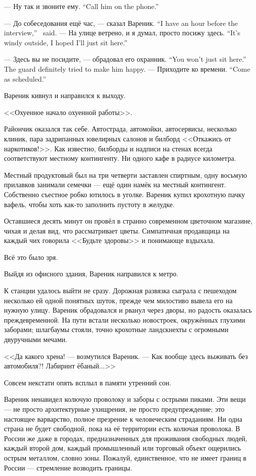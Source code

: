 {--- Ну так и звоните ему.}
{``Call him on the phone.''}

{--- До собеседования ещё час, --- сказал Вареник.}
{``I have an hour before the interview,'' \Varenik\ said.}
{--- На улице ветрено, и я думал, просто посижу здесь.}
{``It's windy outside, I hoped I'll just sit here.''}

{--- Здесь вы не посидите, --- обрадовал его охранник.}
{``You won't just sit here.'' The guard definitely tried to make him happy.}
{--- Приходите ко времени.}
{``Come as scheduled.''}

Вареник кивнул и направился к выходу.

<<Охуенное начало охуенной работы>>.

Райончик оказался так себе.
Автострада, автомойки, автосервисы, несколько клиник, пара задрипанных ювелирных салонов и билборд <<Откажись от наркотиков!>>.
Как известно, билборды и надписи на стенах всегда соответствуют местному контингенту.
Ни одного кафе в радиусе километра.

Местный продуктовый был на три четверти заставлен спиртным, одну восьмую прилавков занимали семечки --- ещё один намёк на местный контингент.
Собственно съестное робко ютилось в уголке.
Вареник купил крохотную пачку вафель, чтобы хоть как-то заполнить пустоту в желудке.

Оставшиеся десять минут он провёл в странно современном цветочном магазине, чихая и делая вид, что рассматривает цветы.
Симпатичная продавщица на каждый чих говорила <<Будьте здоровы>> и понимающе вздыхала.

Всё это было зря.

\asterism

Выйдя из офисного здания, Вареник направился к метро.

К станции удалось выйти не сразу.
Дорожная развязка сыграла с пешеходом несколько ей одной понятных шуток, прежде чем милостиво вывела его на нужную улицу.
Вареник обрадовался и рванул через дворы, но радость оказалась преждевременной.
На пути встали несколько новостроек, окружённых глухими заборами;
шлагбаумы стояли, точно крохотные ландскнехты с огромными двуручными мечами.

<<Да какого хрена! --- возмутился Вареник.
--- Как вообще здесь выживать без автомобиля?!
Лабиринт ёбаный...>>

Совсем некстати опять всплыл в памяти утренний сон.

Вареник ненавидел колючую проволоку и заборы с острыми пиками.
Эти вещи --- не просто архитектурные ухищрения, не просто предупреждение;
это настоящее варварство, полное презрение к человеческим страданиям.
Ни одна страна не будет свободной, пока на её территории есть колючая проволока.
В России же даже в городах, предназначенных для проживания свободных людей, каждый второй дом, каждый промышленный или торговый объект ощерились острым металлом, словно зоны.
Пожалуй, единственное, что не имеет границ в России --- стремление возводить границы.

